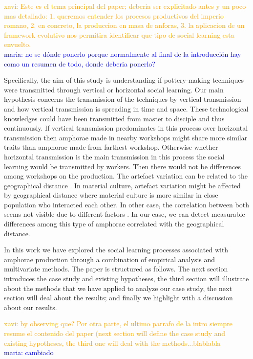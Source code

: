 \documentclass[review]{elsarticle}
\newcommand{\memo}[2]{\textcolor{#1}{#2}}
\newcommand{\xavi}[1]{\memo{orange}{xavi: #1\\}}
\newcommand{\maria}[1]{\memo{blue}{maria: #1\\}}
\begin{document}
\xavi{Este es el tema principal del paper; deberia ser explicitado antes y un poco mas detallado: 1. queremos entender los procesos productivos del imperio romano, 2. en concreto, la produccion en masa de anforas, 3. la aplicacion de un framework evolutivo nos permitira identificar que tipo de social learning esta envuelto.}
\maria{no se dónde ponerlo porque normalmente al final de la introducción hay como un resumen de todo, donde deberia ponerlo?}
 

Specifically, the aim of this study is understanding if pottery-making techniques were transmitted through vertical or horizontal social learning. Our main hypothesis concerns the transmission of the techniques by vertical transmission and how vertical transmission is spreading in time and space. These technological knowledges could have been transmitted from master to disciple and thus continuously. If vertical transmission predominates in this process over horizontal transmission then amphorae made in nearby workshops might share more similar traits than amphorae made from farthest workshop. Otherwise whether horizontal transmission is the main transmission in this process the social learning would be transmitted by workers. Then there would not be differences among workshops on the production. The artefact variation can be related to the geographical distance \citep{bjorklund_effect_2010,shennan_isolation-by-distance_2015, van_strien_isolation-by-distance_2015}. In material culture, artefact variation might be affected by geographical distance where material culture is more similar in close population who interacted each other. In other case, the correlation between both seems not visible due to different factors \citep{hart_effects_2012}. In our case, we can detect measurable differences among this type of amphorae correlated with the geographical distance.

In this work we have explored the social learning processes associated with amphorae production through a combination of empirical analysis and multivariate methods. The paper is structured as follows. The next section introduces the case study and existing hypotheses, the third section will illustrate about the methods that we have applied to analyze our case study, the next section will deal about the results; and finally we highlight with a discussion about our results.  

\xavi{by observing que? Por otra parte, el ultimo parrafo de la intro siempre resume el contenido del paper (next section will define the case study and existing hypotheses, the third one will deal with the methods...blablabla}
\maria{cambiado}
\end{document}
